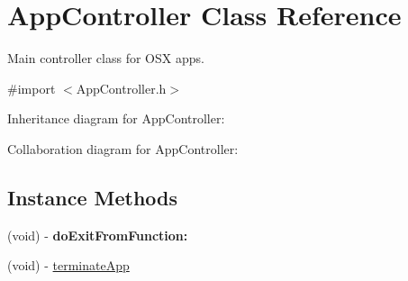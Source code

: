 \hypertarget{interface_app_controller}{\section{App\+Controller Class Reference}
\label{interface_app_controller}
}


Main controller class for O\+S\+X apps.  




{\ttfamily \#import $<$App\+Controller.\+h$>$}



Inheritance diagram for App\+Controller\+:


Collaboration diagram for App\+Controller\+:
\subsection*{Instance Methods}
\begin{DoxyCompactItemize}
\item 
\hypertarget{interface_app_controller_a1250e32c14f2bf10922fca990d6d8c7d}{(void) -\/ {\bfseries do\+Exit\+From\+Function\+:}}\label{interface_app_controller_a1250e32c14f2bf10922fca990d6d8c7d}

\item 
(void) -\/ \hyperlink{interface_app_controller_ae0129a03b62ed931ba468b50575661db}{terminate\+App}
\end{DoxyCompactItemize}
